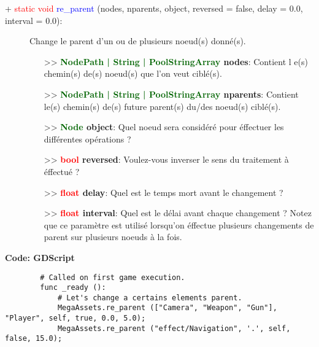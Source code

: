 \documentclass[a4paper, 11pt]{article}
\begin{document}
	\begin{description}
		\item [+ \textcolor{red}{static void} \textcolor{blue}{re\_parent} (nodes, nparents, object, 
		reversed = false, delay = 0.0, interval = 0.0):] Change le parent d'un ou de plusieurs noeud(s) 
		donné(s).
		\begin{itemize}
			\item [>> \textbf{\textcolor{darkgreen}{NodePath | String | PoolStringArray} nodes}:] Contient l
			e(s) chemin(s) de(s) noeud(s) que l'on veut ciblé(s).
			\item [>> \textbf{\textcolor{darkgreen}{NodePath | String | PoolStringArray} nparents}:]
			Contient le(s) chemin(s) de(s) future parent(s) du/des noeud(s) ciblé(s).
			\item [>> \textbf{\textcolor{darkgreen}{Node} object}:] Quel noeud sera considéré pour éffectuer
			les différentes opérations ?
			\item [>> \textbf{\textcolor{red}{bool} reversed}:] Voulez-vous inverser le sens du traitement à 
			éffectué ?
			\item [>> \textbf{\textcolor{red}{float} delay}:] Quel est le temps mort avant le changement ?
			\item [>> \textbf{\textcolor{red}{float} interval}:] Quel est le délai avant chaque changement ?
			Notez que ce paramètre est utilisé lorsqu'on éffectue plusieurs changements de parent sur 
			plusieurs noeuds à la fois.\\
		\end{itemize}
	\end{description}
	\textbf{Code: GDScript}
	\begin{lstlisting}
		# Called on first game execution.
		func _ready ():
			# Let's change a certains elements parent.
			MegaAssets.re_parent (["Camera", "Weapon", "Gun"], "Player", self, true, 0.0, 5.0);
			MegaAssets.re_parent ("effect/Navigation", '.', self, false, 15.0);
	\end{lstlisting}
\end{document}
